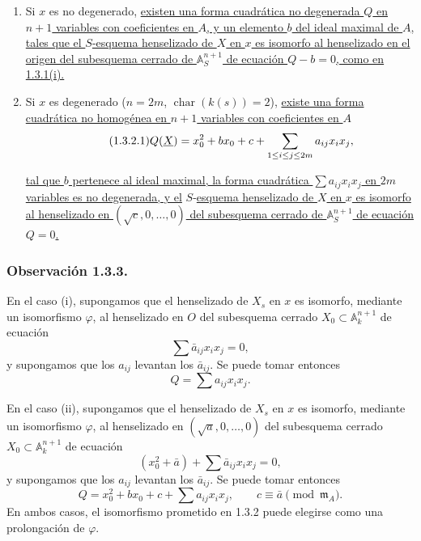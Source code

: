 \begin{enumerate}[label=(\roman*),leftmargin=2.6em]
\item Si $x$ es no degenerado, \underline{existen una forma cuadrática
no degenerada $Q$ en $n+1$ variables con coeficientes en $A$, y un
elemento $b$ del ideal maximal de $A$, tales que el $S$-esquema
henselizado de $X$ en $x$ es isomorfo al henselizado en el origen del
subesquema cerrado de $\mathbb A_S^{n+1}$ de ecuación $Q-b=0$, como en
1.3.1(i).}

\item Si $x$ es degenerado
($n=2m$, $\operatorname{char}(k(s))=2$), \underline{existe una forma
cuadrática no homogénea en $n+1$ variables con coeficientes en $A$}
\begin{equation}\tag{\sisi{4.14.2}{1.3.2.1}}
Q(\underline X)=\sisi{x_0}{x_0^2}+b x_0+c+
 \sum_{1\leq i\leq j\leq 2m}a_{ij}x_i x_j,
\end{equation}

\pageoriginale

\underline{tal que $b$ pertenece al ideal maximal, la forma cuadrática
$\sum a_{ij}x_i x_j$ en $2m$ variables es no degenerada, y el}
$S$-\underline{esquema henselizado de $X$ en $x$ es isomorfo al henselizado en
$(\sqrt c,0,\ldots,0)$ del subesquema cerrado de
$\mathbb A_S^{n+1}$ de ecuación $Q=0$.}
\end{enumerate}

\subsubsection*{Observación 1.3.3.}
En el caso (i), supongamos que el henselizado de $X_s$ en $x$ es
isomorfo, mediante un isomorfismo $\varphi$, al henselizado en $O$ del
subesquema cerrado $X_0\subset\mathbb A_k^{n+1}$ de ecuación
\[
\sum\bar a_{ij}x_i x_j=0,
\]
y supongamos que los $a_{ij}$ levantan los $\bar a_{ij}$. Se puede
tomar entonces
\[
Q=\sum a_{ij}x_i x_j.
\]

En el caso (ii), supongamos que el henselizado de $X_s$ en $x$ es
isomorfo, mediante un isomorfismo $\varphi$, al henselizado en
$(\sqrt a,0,\ldots,0)$ del subesquema cerrado
$X_0\subset\mathbb A_k^{n+1}$ de ecuación
\[
(x_0^2+\bar a)+\sum\bar a_{ij}x_i x_j=0,
\]
y supongamos que los $a_{ij}$ levantan los $\bar a_{ij}$. Se puede
tomar entonces
\[
Q=x_0^2+b x_0+c+\sum a_{ij}x_i x_j,
\qquad c\equiv\bar a\pmod{\mathfrak m_A}.
\]
En ambos casos, el isomorfismo prometido en 1.3.2 puede elegirse como
una prolongación de $\varphi$.

